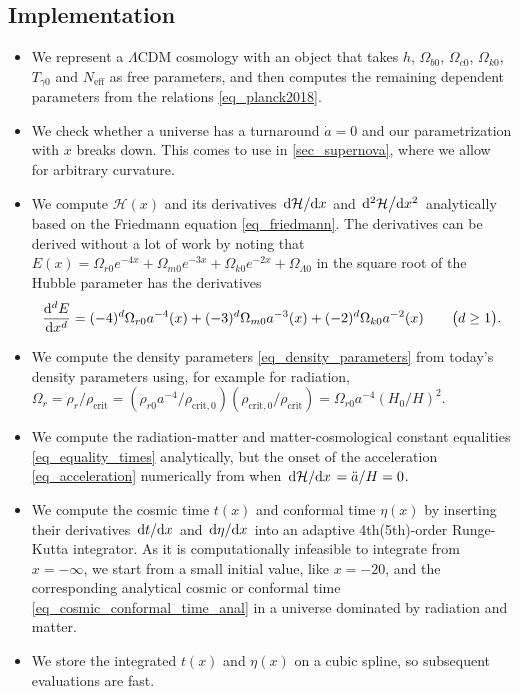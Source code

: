 \documentclass[10pt,a4paper]{article}
\begin{document}
\subsection{Implementation}
\label{sec_background_cosmology_implementation}

\begin{itemize}
	\item We represent a $\Lambda$CDM cosmology with an object that takes $h$, $\Omega_{b0}$, $\Omega_{c0}$, $\Omega_{k0}$, $T_{\gamma0}$ and $N_\text{eff}$ as free parameters,
	      and then computes the remaining dependent parameters from the relations \eqref{eq_planck2018}.
	\item We check whether a universe has a turnaround $\dot{a} = 0$ and our parametrization with $x$ breaks down.
	      This comes to use in \cref{sec_supernova}, where we allow for arbitrary curvature.
	\item We compute $\mathcal{H}(x)$ and its derivatives $\odv{\mathcal{H}}/{x}$ and $\odv[2]{\mathcal{H}}/{x}$ analytically based on the Friedmann equation \eqref{eq_friedmann}.
	      The derivatives can be derived without a lot of work by noting that
		  $E(x) = \Omega_{r0} e^{-4x} + \Omega_{m0} e^{-3x} + \Omega_{k0} e^{-2x} + \Omega_{\Lambda0}$
		  in the square root of the Hubble parameter has the derivatives
		  \begin{equation*}
			  \odv[d]{E}{x} = (-4)^d \Omega_{r0} a^{-4}(x) + (-3)^d \Omega_{m0} a^{-3}(x) + (-2)^d \Omega_{k0} a^{-2}(x) \qquad \big(d \geq 1\big).
		  \end{equation*}
	\item We compute the density parameters \eqref{eq_density_parameters} from today's density parameters using, for example for radiation, $\Omega_r = \rho_r / \rho_\text{crit} = (\rho_{r0} a^{-4} / \rho_{\text{crit},0}) (\rho_{\text{crit},0} / \rho_\text{crit}) = \Omega_{r0} a^{-4} (H_0 / H)^2$.
	\item We compute the radiation-matter and matter-cosmological constant equalities \eqref{eq_equality_times} analytically,
	      but the onset of the acceleration \eqref{eq_acceleration} numerically from when $\odv{\mathcal{H}}/{x} = \ddot{a} / H = 0$.
	\item We compute the cosmic time $t(x)$ and conformal time $\eta(x)$ by inserting their derivatives $\odv{t}/{x}$ and $\odv{\eta}/{x}$ into an adaptive 4th(5th)-order Runge-Kutta integrator.
	      As it is computationally infeasible to integrate from $x=-\infty$,
	      we start from a small initial value, like $x = -20$,
	      and the corresponding analytical cosmic or conformal time \eqref{eq_cosmic_conformal_time_anal} in a universe dominated by radiation and matter.
	\item We store the integrated $t(x)$ and $\eta(x)$ on a cubic spline, so subsequent evaluations are fast.
\end{itemize}
\end{document}
